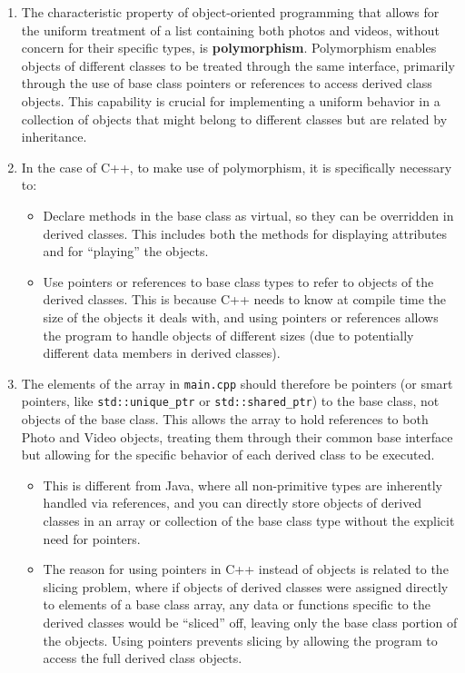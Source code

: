 \documentclass[
]{article}
\providecommand{\tightlist}{%
  \setlength{\itemsep}{0pt}\setlength{\parskip}{0pt}}
\begin{document}
\begin{enumerate}
\def\labelenumi{\arabic{enumi}.}
\item
  The characteristic property of object-oriented programming that allows
  for the uniform treatment of a list containing both photos and videos,
  without concern for their specific types, is \textbf{polymorphism}.
  Polymorphism enables objects of different classes to be treated
  through the same interface, primarily through the use of base class
  pointers or references to access derived class objects. This
  capability is crucial for implementing a uniform behavior in a
  collection of objects that might belong to different classes but are
  related by inheritance.
\item
  In the case of C++, to make use of polymorphism, it is specifically
  necessary to:

  \begin{itemize}
  \tightlist
  \item
    Declare methods in the base class as virtual, so they can be
    overridden in derived classes. This includes both the methods for
    displaying attributes and for “playing” the objects.
  \item
    Use pointers or references to base class types to refer to objects
    of the derived classes. This is because C++ needs to know at compile
    time the size of the objects it deals with, and using pointers or
    references allows the program to handle objects of different sizes
    (due to potentially different data members in derived classes).
  \end{itemize}
\item
  The elements of the array in \texttt{main.cpp} should therefore be
  pointers (or smart pointers, like \texttt{std::unique\_ptr} or
  \texttt{std::shared\_ptr}) to the base class, not objects of the base
  class. This allows the array to hold references to both Photo and
  Video objects, treating them through their common base interface but
  allowing for the specific behavior of each derived class to be
  executed.

  \begin{itemize}
  \item
    This is different from Java, where all non-primitive types are
    inherently handled via references, and you can directly store
    objects of derived classes in an array or collection of the base
    class type without the explicit need for pointers.
  \item
    The reason for using pointers in C++ instead of objects is related
    to the slicing problem, where if objects of derived classes were
    assigned directly to elements of a base class array, any data or
    functions specific to the derived classes would be “sliced” off,
    leaving only the base class portion of the objects. Using pointers
    prevents slicing by allowing the program to access the full derived
    class objects.
  \end{itemize}
\end{enumerate}
\end{document}
